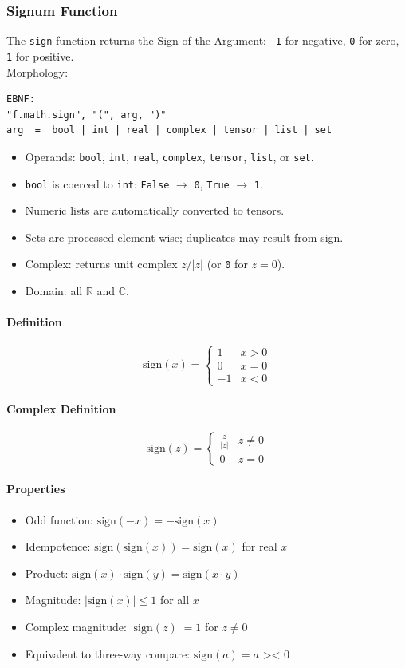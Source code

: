 \subsubsection{Signum Function}
The \texttt{sign} function returns the Sign of the Argument: \texttt{-1} for negative, \texttt{0} for zero, \texttt{1} for positive.\\
Morphology:
\begin{verbatim}
EBNF:
"f.math.sign", "(", arg, ")"
arg  =  bool | int | real | complex | tensor | list | set
\end{verbatim}
\begin{itemize}
\item Operands: \texttt{bool}, \texttt{int}, \texttt{real}, \texttt{complex}, \texttt{tensor}, \texttt{list}, or \texttt{set}.
\item \texttt{bool} is coerced to \texttt{int}: \texttt{False} $\to$ \texttt{0}, \texttt{True} $\to$ \texttt{1}.
\item Numeric lists are automatically converted to tensors.
\item Sets are processed element-wise; duplicates may result from sign.
\item Complex: returns unit complex $z / |z|$ (or \texttt{0} for $z = 0$).
\item Domain: all $\mathbb{R}$ and $\mathbb{C}$.
\end{itemize}

\paragraph{Definition}
\[
\text{sign}(x) = \begin{cases} 1 & x > 0 \\ 0 & x = 0 \\ -1 & x < 0 \end{cases}
\]

\paragraph{Complex Definition}
\[
\text{sign}(z) = \begin{cases} \frac{z}{|z|} & z \neq 0 \\ 0 & z = 0 \end{cases}
\]

\paragraph{Properties}
\begin{itemize}
\item Odd function: $\text{sign}(-x) = -\text{sign}(x)$
\item Idempotence: $\text{sign}(\text{sign}(x)) = \text{sign}(x)$ for real $x$
\item Product: $\text{sign}(x) \cdot \text{sign}(y) = \text{sign}(x \cdot y)$
\item Magnitude: $|\text{sign}(x)| \leq 1$ for all $x$
\item Complex magnitude: $|\text{sign}(z)| = 1$ for $z \neq 0$
\item Equivalent to three-way compare: $\text{sign}(a) = a \texttt{ >< } 0$
\end{itemize}

